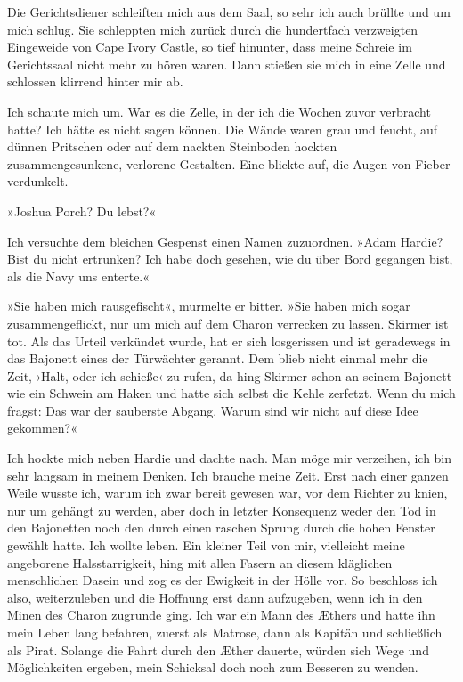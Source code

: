 \bigpar

Die Gerichtsdiener schleiften mich aus dem Saal, so sehr ich auch
brüllte und um mich schlug. Sie schleppten mich zurück durch die
hundertfach verzweigten Eingeweide von Cape Ivory Castle, so tief
hinunter, dass meine Schreie im Gerichtssaal nicht mehr zu hören
waren. Dann stießen sie mich in eine Zelle und schlossen klirrend
hinter mir ab.

Ich schaute mich um. War es die Zelle, in der ich die Wochen zuvor
verbracht hatte? Ich hätte es nicht sagen können. Die Wände waren
grau und feucht, auf dünnen Pritschen oder auf dem nackten
Steinboden hockten zusammengesunkene, verlorene Gestalten. Eine
blickte auf, die Augen von Fieber verdunkelt.

»Joshua Porch? Du lebst?«

Ich versuchte dem bleichen Gespenst einen Namen zuzuordnen. »Adam
Hardie? Bist du nicht ertrunken? Ich habe doch gesehen, wie du über
Bord gegangen bist, als die Navy uns enterte.«

»Sie haben mich rausgefischt«, murmelte er bitter. »Sie haben mich
sogar zusammengeflickt, nur um mich auf dem Charon verrecken zu
lassen. Skirmer ist tot. Als das Urteil verkündet wurde, hat er
sich losgerissen und ist geradewegs in das Bajonett eines der
Türwächter gerannt. Dem blieb nicht einmal mehr die Zeit, ›Halt,
oder ich schieße‹ zu rufen, da hing Skirmer schon an seinem
Bajonett wie ein Schwein am Haken und hatte sich selbst die Kehle
zerfetzt. Wenn du mich fragst: Das war der sauberste Abgang. Warum
sind wir nicht auf diese Idee gekommen?«

Ich hockte mich neben Hardie und dachte nach. Man möge mir
verzeihen, ich bin sehr langsam in meinem Denken. Ich brauche meine
Zeit. Erst nach einer ganzen Weile wusste ich, warum ich zwar
bereit gewesen war, vor dem Richter zu knien, nur um gehängt zu
werden, aber doch in letzter Konsequenz weder den Tod in den
Bajonetten noch den durch einen raschen Sprung durch die hohen
Fenster gewählt hatte. Ich wollte leben. Ein kleiner Teil von mir,
vielleicht meine angeborene Halsstarrigkeit, hing mit allen Fasern
an diesem kläglichen menschlichen Dasein und zog es der Ewigkeit in
der Hölle vor. So beschloss ich also, weiterzuleben und die
Hoffnung erst dann aufzugeben, wenn ich in den Minen des Charon
zugrunde ging. Ich war ein Mann des Æthers und hatte ihn mein Leben
lang befahren, zuerst als Matrose, dann als Kapitän und schließlich
als Pirat. Solange die Fahrt durch den Æther dauerte, würden sich
Wege und Möglichkeiten ergeben, mein Schicksal doch noch zum
Besseren zu wenden.

